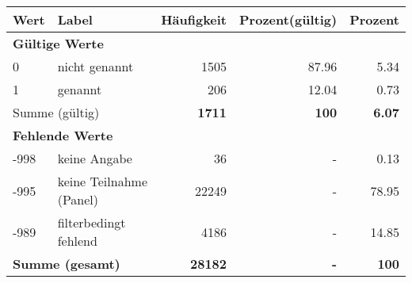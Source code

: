      \begin{longtable}{lXrrr}
     \toprule
     \textbf{Wert} & \textbf{Label} & \textbf{Häufigkeit} & \textbf{Prozent(gültig)} & \textbf{Prozent} \\
     \endhead
     \midrule
     \multicolumn{5}{l}{\textbf{Gültige Werte}}\\

     0 &
     \multicolumn{1}{X}{ nicht genannt   } &


       \num{1505} &
       \num[round-mode=places,round-precision=2]{87.96} &
         \num[round-mode=places,round-precision=2]{5.34} \\

     1 &
     \multicolumn{1}{X}{ genannt   } &


       \num{206} &
       \num[round-mode=places,round-precision=2]{12.04} &
         \num[round-mode=places,round-precision=2]{0.73} \\
     \midrule
     \multicolumn{2}{l}{Summe (gültig)} &
       \textbf{\num{1711}} &
     \textbf{\num{100}} &
       \textbf{\num[round-mode=places,round-precision=2]{6.07}} \\
     \multicolumn{5}{l}{\textbf{Fehlende Werte}}\\
       -998 &
       keine Angabe &
         \num{36} &
        - &
         \num[round-mode=places,round-precision=2]{0.13} \\
       -995 &
       keine Teilnahme (Panel) &
         \num{22249} &
        - &
         \num[round-mode=places,round-precision=2]{78.95} \\
       -989 &
       filterbedingt fehlend &
         \num{4186} &
        - &
         \num[round-mode=places,round-precision=2]{14.85} \\
     \midrule
     \multicolumn{2}{l}{\textbf{Summe (gesamt)}} &
          \textbf{\num{28182}} &
        \textbf{-} &
        \textbf{\num{100}} \\
     \bottomrule
     \end{longtable}
     
